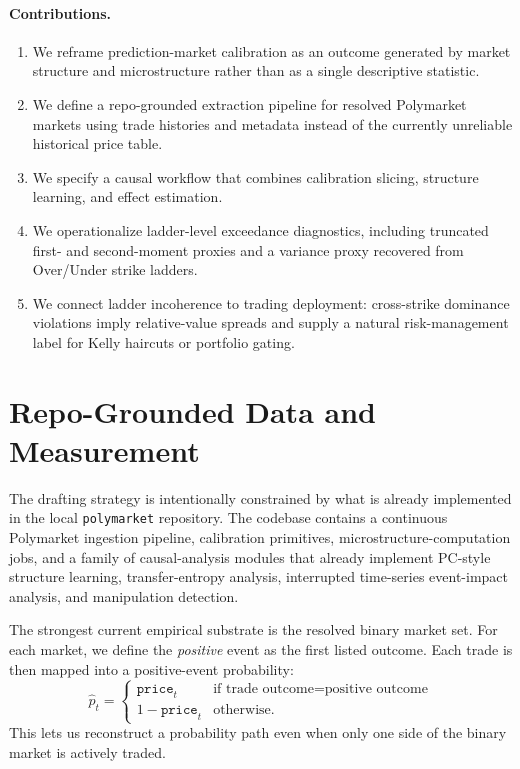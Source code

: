 \documentclass[10pt]{article}
\begin{document}
\paragraph{Contributions.}
\begin{enumerate}[leftmargin=1.5em,itemsep=0.2em]
  \item We reframe prediction-market calibration as an outcome generated by
  market structure and microstructure rather than as a single descriptive
  statistic.
  \item We define a repo-grounded extraction pipeline for resolved Polymarket
  markets using trade histories and metadata instead of the currently unreliable
  historical price table.
  \item We specify a causal workflow that combines calibration slicing,
  structure learning, and effect estimation.
  \item We operationalize ladder-level exceedance diagnostics, including
  truncated first- and second-moment proxies and a variance proxy recovered
  from Over/Under strike ladders.
  \item We connect ladder incoherence to trading deployment: cross-strike
  dominance violations imply relative-value spreads and supply a natural
  risk-management label for Kelly haircuts or portfolio gating.
\end{enumerate}

\section{Repo-Grounded Data and Measurement}

The drafting strategy is intentionally constrained by what is already
implemented in the local \texttt{polymarket} repository. The codebase contains a
continuous Polymarket ingestion pipeline, calibration primitives,
microstructure-computation jobs, and a family of causal-analysis modules that
already implement PC-style structure learning, transfer-entropy analysis,
interrupted time-series event-impact analysis, and manipulation detection.

The strongest current empirical substrate is the resolved binary market set. For
each market, we define the \emph{positive} event as the first listed outcome.
Each trade is then mapped into a positive-event probability:
\[
\hat p_t =
\begin{cases}
\texttt{price}_t & \text{if trade outcome} = \text{positive outcome} \\
1-\texttt{price}_t & \text{otherwise.}
\end{cases}
\]
This lets us reconstruct a probability path even when only one side of the
binary market is actively traded.
\end{document}
